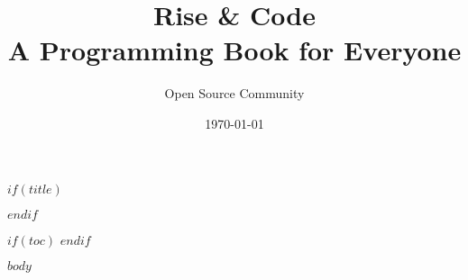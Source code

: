 \documentclass[12pt,a4paper]{book}
\title{\Huge Rise \& Code\\\large A Programming Book for Everyone}
\author{Open Source Community}
\date{\today}
\begin{document}
$if(title)$
\maketitle
$endif$

$if(toc)$
\tableofcontents
\clearpage
$endif$

$body$
\end{document}
